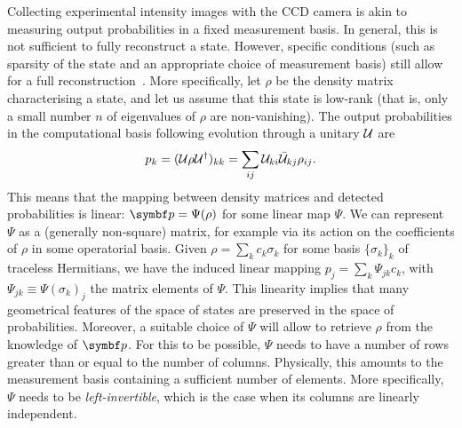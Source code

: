 Collecting experimental intensity images with the \ac{CCD} camera is akin to measuring output probabilities in a fixed measurement basis.
In general, this is not sufficient to fully reconstruct a state.
However, specific conditions (such as sparsity of the state and an appropriate choice of measurement basis) still allow for a full reconstruction~\cite{banchi2018multiphoton}.
More specifically, let $\rho$ be the density matrix characterising a state, and let us assume that this state is low-rank (that is, only a small number $n$ of eigenvalues of $\rho$ are non-vanishing).
The output probabilities in the computational basis following evolution through a unitary ${\mathcal{U}}$ are
\begin{equation}
	p_k = ({\mathcal{U}}\rho{\mathcal{U}}^\dagger)_{kk}
	    = \sum_{ij}{\mathcal{U}}_{ki}\bar{{\mathcal{U}}}_{kj}\rho_{ij}.
\end{equation}
This means that the mapping between density matrices and detected probabilities is linear: $\bs p=\Psi(\rho)$ for some linear map $\Psi$.
We can represent $\Psi$ as a (generally non-square) matrix, for example via its action on the coefficients of $\rho$ in some operatorial basis.
Given $\rho=\sum_k c_k \sigma_k$ for some basis $\{\sigma_k\}_k$ of traceless Hermitians, we have the induced linear mapping $p_j = \sum_k \Psi_{jk}c_k$, with $\Psi_{jk}\equiv\Psi(\sigma_k)_j$ the matrix elements of $\Psi$.
This linearity implies that many geometrical features of the space of states are preserved in the space of probabilities. Moreover, a suitable choice of $\Psi$ will allow to retrieve $\rho$ from the knowledge of $\bs p$.
For this to be possible, $\Psi$ needs to have a number of rows greater than or equal to the number of columns. Physically, this amounts to the measurement basis containing a sufficient number of elements. More specifically, $\Psi$ needs to be \emph{left-invertible}, which is the case when its columns are linearly independent.

